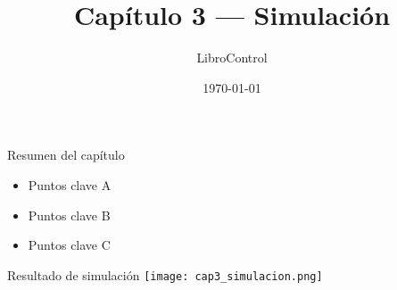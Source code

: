 \documentclass{beamer}
\title{Capítulo 3 — Simulación}
\author{LibroControl}
\date{\today}
\begin{document}
\begin{frame}
  \titlepage
\end{frame}

\begin{frame}{Resumen del capítulo}
  \begin{itemize}
    \item Puntos clave A
    \item Puntos clave B
    \item Puntos clave C
  \end{itemize}
\end{frame}

\begin{frame}{Resultado de simulación}
  \centering
  \texttt{[image: cap3\_simulacion.png]}
\end{frame}
\end{document}
